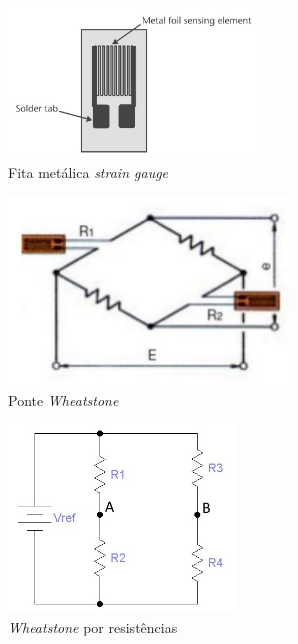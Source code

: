 \\
\begin{minipage}[!b]{.5\linewidth}
\begin{figure}[H]
	\captionsetup{justification=raggedright,singlelinecheck=false}
	\flushleft
	\includegraphics[height=4cm]{./image/PESTA/general/strain_gauge_1.jpg}
	\caption{Fita metálica \textit{strain gauge} \cite{book-9}}
	\label{strain_gauge_1}
\end{figure}
\end{minipage}
\begin{minipage}[!b]{.5\linewidth}
\begin{figure}[H]
	\captionsetup{justification=raggedright,singlelinecheck=false}
	\flushleft
	\includegraphics[height=5cm]{./image/PESTA/schematic/Wheatstone_2.jpg}
	\qquad \caption{Ponte \textit{Wheatstone}}
	\label{wheatstone_2}
\end{figure}
\end{minipage}
\begin{minipage}[!b]{.4\linewidth}
	\begin{figure}[H]
		\captionsetup{justification=raggedright,singlelinecheck=false}
		\flushleft
		\includegraphics[height=5cm]{./image/PESTA/schematic/Wheatstone_1.jpg}
		\caption{\textit{Wheatstone} por resistências \cite{book-10}}
		\label{wheatstone_1}
	\end{figure}
\end{minipage}
